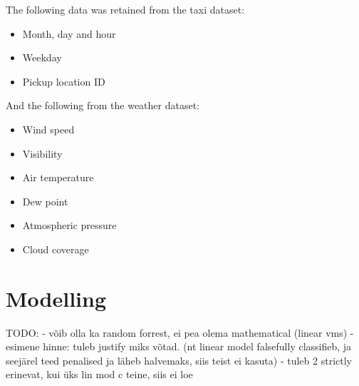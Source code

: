 \documentclass[11pt]{article}
\begin{document}
The following data was retained from the taxi dataset:
\begin{itemize}
    \item Month, day and hour
    \item Weekday
    \item Pickup location ID
\end{itemize}

And the following from the weather dataset:
\begin{itemize}
    \item Wind speed
    \item Visibility
    \item Air temperature
    \item Dew point
    \item Atmospheric pressure
    \item Cloud coverage
\end{itemize}

\section{Modelling}

\iffalse
    TODO:
    - võib olla ka random forrest, ei pea olema mathematical (linear vms)
    - esimene hinne: tuleb justify miks võtad. (nt linear model falsefully classifieb, ja seejärel teed penalised ja läheb halvemaks, siis teist ei kasuta)
        - tuleb 2 strictly erinevat, kui üks lin mod c teine, siis ei loe
\end{document}
